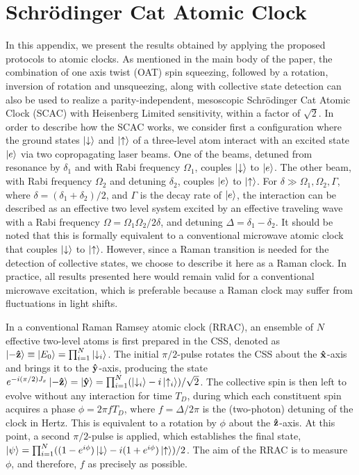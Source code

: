 \documentclass[aps,pra,letterpaper,superscriptaddress,showpacs,amsmath,floats,twocolumn]{revtex4-1}
\begin{document}
\section{Schr\"odinger Cat Atomic Clock}
In this appendix, we present the results obtained by applying the proposed protocols to atomic clocks. As mentioned in the main body of the paper, the combination of one axis twist (OAT) spin squeezing, followed by a rotation, inversion of rotation and unsqueezing, along with collective state detection can also be used to realize a parity-independent, mesoscopic Schr\"odinger Cat Atomic Clock (SCAC) with Heisenberg Limited sensitivity, within a factor of $\sqrt{2}$. In order to describe how the SCAC works, we consider first a configuration where the ground states $\ket{\downarrow}$ and $\ket{\uparrow}$ of a three-level atom interact with an excited state $\ket{e}$ via two copropagating laser beams. One of the beams, detuned from resonance by $\delta_1$ and with Rabi frequency $\Omega_1$, couples $\ket{\downarrow}$ to $\ket{e}$. The other beam, with Rabi frequency $\Omega_2$ and detuning $\delta_2$, couples $\ket{e}$ to $\ket{\uparrow}$. For $\delta \gg \Omega_1, \Omega_2, \Gamma$, where $\delta=(\delta_1 + \delta_2)/2$, and $\Gamma$ is the decay rate of $\ket{e}$, the interaction can be described as an effective two level system excited by an effective traveling wave with a Rabi frequency $\Omega=\Omega_1\Omega_2/2\delta$, and detuning $\Delta=\delta_1 - \delta_2$. It should be noted that this is formally equivalent to a conventional microwave atomic clock that couples $\ket{\downarrow}$ to $\ket{\uparrow}$. However, since a Raman transition is needed for the detection of collective states, we choose to describe it here as a Raman clock. In practice, all results presented here would remain valid for a conventional microwave excitation, which is preferable because a Raman clock may suffer from fluctuations in light shifts.

In a conventional Raman Ramsey atomic clock (RRAC), an ensemble of $N$ effective two-level atoms is first prepared in the CSS, denoted as $\ket{-\vu{z}}\equiv\ket{E_0}=\prod_{i=1}^N\ket{\downarrow_i}$. The initial $\pi/2$-pulse rotates the CSS about the $\vu{x}$-axis and brings it to the $\vu{y}$-axis, producing the state $e^{-i(\pi/2) J_x}\ket{-\vu{z}}=\ket{\vu{y}} =\prod_{i=1}^N(\ket{\downarrow_i}-i\ket{\uparrow_i})/\sqrt{2}$. The collective spin is then left to evolve without any interaction for time $T_D$, during which each constituent spin acquires a phase $\phi=2\pi fT_D$, where $f=\Delta/2\pi$ is the (two-photon) detuning of the clock in Hertz. This is equivalent to a rotation by $\phi$ about the $\vu{z}$-axis. At this point, a second $\pi/2$-pulse is applied, which establishes the final state, $\ket{\psi}=\prod_{i=1}^N((1-e^{i\phi})\ket{\downarrow}-i(1+e^{i\phi})\ket{\uparrow})/2$. The aim of the RRAC is to measure $\phi$, and therefore, $f$ as precisely as possible.
\end{document}
